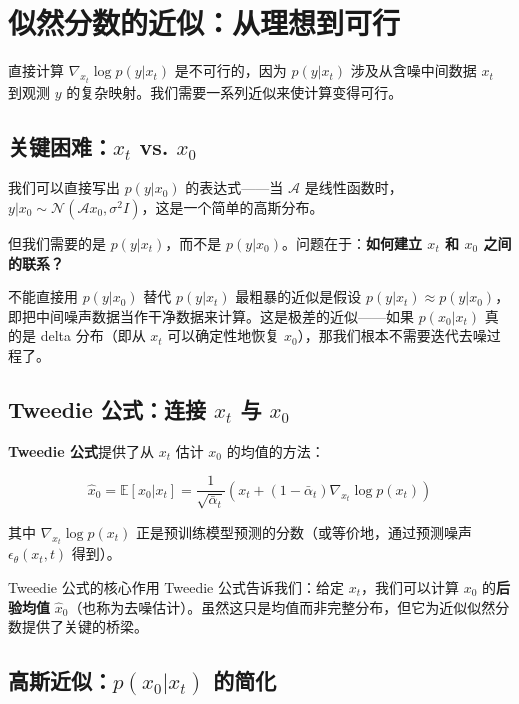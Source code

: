 \section{似然分数的近似：从理想到可行}

直接计算 $\nabla_{x_t} \log p(y | x_t)$ 是不可行的，因为 $p(y | x_t)$ 涉及从含噪中间数据 $x_t$ 到观测 $y$ 的复杂映射。我们需要一系列近似来使计算变得可行。

\subsection{关键困难：$x_t$ vs. $x_0$}

我们可以直接写出 $p(y | x_0)$ 的表达式——当 $\mathcal{A}$ 是线性函数时，$y | x_0 \sim \mathcal{N}(\mathcal{A} x_0, \sigma^2 I)$，这是一个简单的高斯分布。

但我们需要的是 $p(y | x_t)$，而不是 $p(y | x_0)$。问题在于：\textbf{如何建立 $x_t$ 和 $x_0$ 之间的联系？}

\begin{warningbox}{不能直接用 $p(y|x_0)$ 替代 $p(y|x_t)$}
最粗暴的近似是假设 $p(y|x_t) \approx p(y|x_0)$，即把中间噪声数据当作干净数据来计算。这是极差的近似——如果 $p(x_0|x_t)$ 真的是 delta 分布（即从 $x_t$ 可以确定性地恢复 $x_0$），那我们根本不需要迭代去噪过程了。
\end{warningbox}

\subsection{Tweedie 公式：连接 $x_t$ 与 $x_0$}

\textbf{Tweedie 公式}提供了从 $x_t$ 估计 $x_0$ 的均值的方法：

$$
\hat{x}_0 = \mathbb{E}[x_0 | x_t] = \frac{1}{\sqrt{\bar{\alpha}_t}} \left( x_t + (1 - \bar{\alpha}_t) \nabla_{x_t} \log p(x_t) \right)
$$

其中 $\nabla_{x_t} \log p(x_t)$ 正是预训练模型预测的分数（或等价地，通过预测噪声 $\epsilon_\theta(x_t, t)$ 得到）。

\begin{importantbox}{Tweedie 公式的核心作用}
Tweedie 公式告诉我们：给定 $x_t$，我们可以计算 $x_0$ 的\textbf{后验均值} $\hat{x}_0$（也称为去噪估计）。虽然这只是均值而非完整分布，但它为近似似然分数提供了关键的桥梁。
\end{importantbox}

\subsection{高斯近似：$p(x_0 | x_t)$ 的简化}

